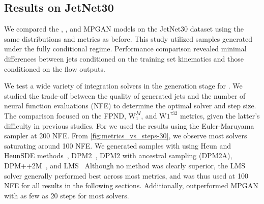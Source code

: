 \subsection{Results on JetNet30}

We compared the \pcdroid, \pcjedi, and MPGAN models on the JetNet30 dataset using the same distributions and metrics as before.
This study utilized \pcdroid samples generated under the fully conditional regime.
Performance comparison revealed minimal differences between jets conditioned on the training set kinematics and those conditioned on the flow outputs.

We test a wide variety of integration solvers in the generation stage for \pcjedi.
We studied the trade-off between the quality of generated jets and the number of neural function evaluations (NFE) to determine the optimal solver and step size.
The comparison focused on the FPND, $\mathrm{W}_1^M$, and $\mathrm{W}1^{\tau{32}}$ metrics, given the latter's difficulty in previous studies.
For \pcjedi we used the results using the Euler-Maruyama sampler at 200 NFE.
From \cref{fig:metrics_vs_steps-30}, we observe most solvers saturating around 100 NFE.
We generated samples with \pcdroid using Heun and HeunSDE methods~\cite{ElucidatingDesignSpace}, DPM2~\cite{DPMSolverFastODE}, DPM2 with ancestral sampling (DPM2A), DPM++2M~\cite{DPMSolverFastSolver}, and LMS~\cite{ODEBook}
Although no method was clearly superior, the LMS solver generally performed best across most metrics, and was thus used at 100 NFE for all \pcdroid results in the following sections.
Additionally, \pcdroid outperformed MPGAN with as few as 20 steps for most solvers.

